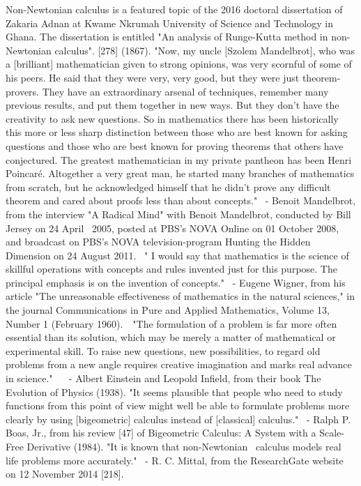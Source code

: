 \documentclass[12pt]{article}
\begin{document}
Non-Newtonian calculus is a featured topic of the 2016 doctoral dissertation of Zakaria Adnan at Kwame Nkrumah University of Science and Technology in Ghana. The dissertation is entitled "An analysis of Runge-Kutta method in non-Newtonian calculus". [278] (1867).
"Now, my uncle [Szolem Mandelbrot], who was a [brilliant] mathematician given to strong opinions, was very scornful of some of his peers. He said that they were very, very good, but they were just theorem-provers. They have an extraordinary arsenal of techniques, remember many previous results, and put them together in new ways. But they don't have the creativity to ask new questions. So in mathematics there has been historically this more or less sharp distinction between those who are best known for asking questions and those who are best known for proving theorems that others have conjectured. The greatest mathematician in my private pantheon has been Henri Poincaré. Altogether a very great man, he started many branches of mathematics from scratch, but he acknowledged himself that he didn't prove any difficult theorem and cared about proofs less than about concepts."  - Benoit Mandelbrot, from the interview "A Radical Mind" with Benoit Mandelbrot, conducted by Bill Jersey on 24 April  2005, posted at PBS's NOVA Online on 01 October 2008, and broadcast on PBS's NOVA television-program Hunting the Hidden Dimension on 24 August 2011. 
" I would say that mathematics is the science of skillful operations with concepts and rules invented just for this purpose. The principal emphasis is on the invention of concepts."  - Eugene Wigner, from his article "The unreasonable effectiveness of mathematics in the natural sciences," in the journal Communications in Pure and Applied Mathematics, Volume 13, Number 1 (February 1960).   "The formulation of a problem is far more often essential than its solution, which may be merely a matter of mathematical or experimental skill. To raise new questions, new possibilities, to regard old problems from a new angle requires creative imagination and marks real advance in science."    - Albert Einstein and Leopold Infield, from their book The Evolution of Physics (1938). 
"It seems plausible that people who need to study functions from this point of view might well be able to formulate problems more clearly by using [bigeometric] calculus instead of [classical] calculus."  - Ralph P. Boas, Jr., from his review [47] of Bigeometric Calculus: A System with a Scale-Free Derivative (1984).
"It is known that non-Newtonian  calculus models real life problems more accurately."  - R. C. Mittal, from the ResearchGate website on 12 November 2014 [218].
\end{document}
